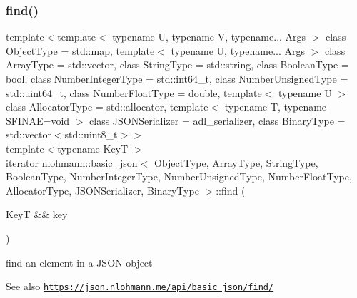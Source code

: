 \subsubsection{\texorpdfstring{find()}{find()}\hspace{0.1cm}{\footnotesize\ttfamily [1/2]}}
{\footnotesize\ttfamily template$<$template$<$ typename U, typename V, typename... Args $>$ class Object\+Type = std\+::map, template$<$ typename U, typename... Args $>$ class Array\+Type = std\+::vector, class String\+Type  = std\+::string, class Boolean\+Type  = bool, class Number\+Integer\+Type  = std\+::int64\+\_\+t, class Number\+Unsigned\+Type  = std\+::uint64\+\_\+t, class Number\+Float\+Type  = double, template$<$ typename U $>$ class Allocator\+Type = std\+::allocator, template$<$ typename T, typename S\+F\+I\+N\+A\+E=void $>$ class J\+S\+O\+N\+Serializer = adl\+\_\+serializer, class Binary\+Type  = std\+::vector$<$std\+::uint8\+\_\+t$>$$>$ \\
template$<$typename KeyT $>$ \\
\hyperlink{classnlohmann_1_1basic__json_aa549b2b382916b3baafb526e5cb410bd}{iterator} \hyperlink{classnlohmann_1_1basic__json}{nlohmann\+::basic\+\_\+json}$<$ Object\+Type, Array\+Type, String\+Type, Boolean\+Type, Number\+Integer\+Type, Number\+Unsigned\+Type, Number\+Float\+Type, Allocator\+Type, J\+S\+O\+N\+Serializer, Binary\+Type $>$\+::find (\begin{DoxyParamCaption}\item[{KeyT \&\&}]{key }\end{DoxyParamCaption})\hspace{0.3cm}{\ttfamily [inline]}}



find an element in a J\+S\+ON object 

\begin{DoxySeeAlso}{See also}
\href{https://json.nlohmann.me/api/basic_json/find/}{\tt https\+://json.\+nlohmann.\+me/api/basic\+\_\+json/find/} 
\end{DoxySeeAlso}
\mbox{\label{classnlohmann_1_1basic__json_a17a516671c29a69bb2e11ca12030316b}} 
